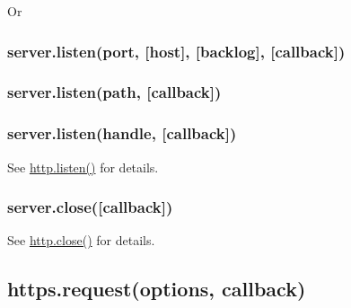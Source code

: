 Or

\begin{Shaded}
\begin{Highlighting}[]
 \NormalTok{);}
 \NormalTok{);}

 
  \NormalTok{: }\NormalTok{(}\NormalTok{)}
\NormalTok{\};}

 
  \NormalTok{(}\NormalTok{);}
  \NormalTok{(}\NormalTok{);}
\NormalTok{(}\NormalTok{);}
\end{Highlighting}
\end{Shaded}

\subsubsection{server.listen(port, {[}host{]}, {[}backlog{]},
{[}callback{]})}

\subsubsection{server.listen(path, {[}callback{]})}

\subsubsection{server.listen(handle, {[}callback{]})}

See
\href{http.html\#http\_server\_listen\_port\_hostname\_backlog\_callback}{http.listen()}
for details.

\subsubsection{server.close({[}callback{]})}

See \href{http.html\#http\_server\_close\_callback}{http.close()} for
details.

\subsection{https.request(options, callback)}


